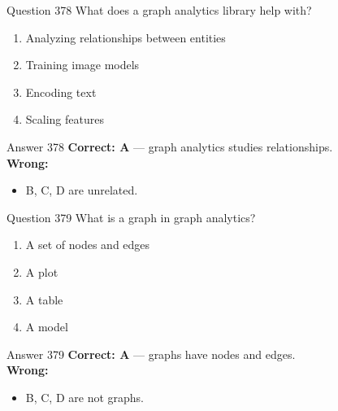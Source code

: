 \documentclass[aspectratio=169,11pt]{beamer}
\begin{document}
	\begin{frame}{Question 378}
		What does a graph analytics library help with?
		\begin{enumerate}[label=\Alph*.]
			\item Analyzing relationships between entities
			\item Training image models
			\item Encoding text
			\item Scaling features
		\end{enumerate}
	\end{frame}
	\begin{frame}{Answer 378}
		\textbf{Correct: A} --- graph analytics studies relationships.\\
		\vspace{0.5em}
		\textbf{Wrong:}
		\begin{itemize}
			\item B, C, D are unrelated.
		\end{itemize}
	\end{frame}
	
	\begin{frame}{Question 379}
		What is a graph in graph analytics?
		\begin{enumerate}[label=\Alph*.]
			\item A set of nodes and edges
			\item A plot
			\item A table
			\item A model
		\end{enumerate}
	\end{frame}
	\begin{frame}{Answer 379}
		\textbf{Correct: A} --- graphs have nodes and edges.\\
		\vspace{0.5em}
		\textbf{Wrong:}
		\begin{itemize}
			\item B, C, D are not graphs.
		\end{itemize}
	\end{frame}
	
\end{document}
